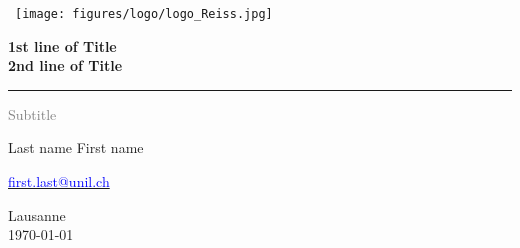 
\begin{titlepage}
\begin{singlespace}

\begin{center}
\hbox{\hspace{-3cm} \texttt{[image: figures/logo/logo\_Reiss.jpg]}}
\end{center}
\vspace*{1cm}

\Huge %
\textbf{1st line of Title\\ 2nd line of Title}\\
\rule{5cm}{0.2pt}

\LARGE
\textcolor{gray}{
Subtitle\\
}
\vspace{2cm}

Last name First name

\large

\href{mailto:first.last@unil.ch}{\small\textcolor{blue}{first.last@unil.ch}}

\vfill


Lausanne\\
\today

\end{singlespace}
\end{titlepage}
\restoregeometry